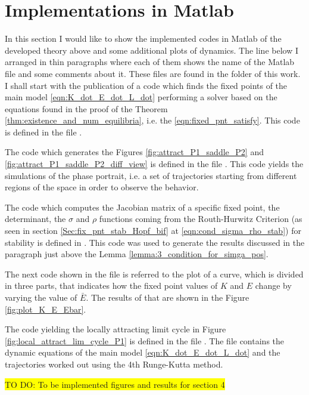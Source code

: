 \section{Implementations in Matlab}\label{app:A}
In this section I would like to show the implemented codes in Matlab of the developed theory above and some additional plots of dynamics. The line below I arranged in thin paragraphs where each of them shows the name of the Matlab file and some comments about it. These files are found in the folder of this work.\\
I shall start with the publication of a code which finds the fixed points of the main model \eqref{eqn:K_dot_E_dot_L_dot} performing a solver based on the equations found in the proof of the Theorem \ref{thm:existence_and_num_equilibria}, i.e. the \eqref{eqn:fixed_pnt_satisfy}. This code is defined in the file . 

The code which generates the Figures \ref{fig:attract_P1_saddle_P2} and \ref{fig:attract_P1_saddle_P2_diff_view} is defined in the file . This code yields the simulations of the phase portrait, i.e. a set of trajectories starting from different regions of the space in order to observe the behavior. 

The code which computes the Jacobian matrix of a specific fixed point, the determinant, the $\sigma$ and $\rho$ functions coming from the Routh-Hurwitz Criterion (as seen in section \ref{Sec:fix_pnt_stab_Hopf_bif} at \eqref{eqn:cond_sigma_rho_stab}) for stability is defined in . This code was used to generate the results discussed in the paragraph just above the Lemma \ref{lemma:3_condition_for_simga_pos}.

The next code shown in the file  is referred to the plot of a curve, which is divided in three parts, that indicates how the fixed point values of $K$ and $E$ change by varying the value of $\bar{E}$. The results of that are shown in the Figure \ref{fig:plot_K_E_Ebar}.

The code yielding the locally attracting limit cycle in Figure \ref{fig:local_attract_lim_cycle_P1} is defined in the file . The file contains the dynamic equations of the main model \eqref{eqn:K_dot_E_dot_L_dot} and the trajectories worked out using the 4th Runge-Kutta method.

\colorbox{yellow}{TO DO: To be implemented figures and results for section 4}